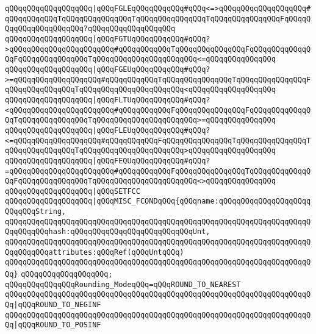 \verb|qQQqqQQqqQQqqQQqqQQq|\verb#|qQQqFGLEqQQqqQQqqQQq#\verb|#qQQq<=>qQQqqQQqqQQqqQQqqQQq#qQQqqQQqqQQqTqQQqqQQqqQQqqQQqTqQQqqQQqqQQqqQQqTqQQqqQQqqQQqqQQqFqQQqqQQqqQQqqQQqqQQqqQQq?qQQqqQQqqQQqqQQqqQQq|\newline
\verb|qQQqqQQqqQQqqQQqqQQq|\verb#|qQQqFGTUqQQqqQQqqQQq#\verb|#qQQq?>qQQqqQQqqQQqqQQqqQQqqQQq#qQQqqQQqqQQqTqQQqqQQqqQQqqQQqFqQQqqQQqqQQqqQQqFqQQqqQQqqQQqqQQqTqQQqqQQqqQQqqQQqqQQqqQQq<=qQQqqQQqqQQqqQQq|\newline
\verb|qQQqqQQqqQQqqQQqqQQq|\verb#|qQQqFGEUqQQqqQQqqQQq#\verb|#qQQq?>=qQQqqQQqqQQqqQQqqQQq#qQQqqQQqqQQqTqQQqqQQqqQQqqQQqTqQQqqQQqqQQqqQQqFqQQqqQQqqQQqqQQqTqQQqqQQqqQQqqQQqqQQqqQQq<qQQqqQQqqQQqqQQqqQQq|\newline
\verb|qQQqqQQqqQQqqQQqqQQq|\verb#|qQQqFLTUqQQqqQQqqQQq#\verb|#qQQq?<qQQqqQQqqQQqqQQqqQQqqQQq#qQQqqQQqqQQqFqQQqqQQqqQQqqQQqFqQQqqQQqqQQqqQQqTqQQqqQQqqQQqqQQqTqQQqqQQqqQQqqQQqqQQqqQQq>=qQQqqQQqqQQqqQQq|\newline
\verb|qQQqqQQqqQQqqQQqqQQq|\verb#|qQQqFLEUqQQqqQQqqQQq#\verb|#qQQq?<=qQQqqQQqqQQqqQQqqQQq#qQQqqQQqqQQqFqQQqqQQqqQQqqQQqTqQQqqQQqqQQqqQQqTqQQqqQQqqQQqqQQqTqQQqqQQqqQQqqQQqqQQqqQQq>qQQqqQQqqQQqqQQqqQQq|\newline
\verb|qQQqqQQqqQQqqQQqqQQq|\verb#|qQQqFEQUqQQqqQQqqQQq#\verb|#qQQq?=qQQqqQQqqQQqqQQqqQQqqQQq#qQQqqQQqqQQqFqQQqqQQqqQQqqQQqTqQQqqQQqqQQqqQQqFqQQqqQQqqQQqqQQqTqQQqqQQqqQQqqQQqqQQqqQQq<>qQQqqQQqqQQqqQQq|\newline
\verb|qQQqqQQqqQQqqQQqqQQq|\verb#|qQQqSETFCC#\newline
\verb|qQQqqQQqqQQqqQQqqQQq|\verb#|qQQqMISC_FCONDqQQq{qQQqname:qQQqqQQqqQQqqQQqqQQqqQQqqQQqString,#\newline
\verb|qQQqqQQqqQQqqQQqqQQqqQQqqQQqqQQqqQQqqQQqqQQqqQQqqQQqqQQqqQQqqQQqqQQqqQQqqQQqqQQqhash:qQQqqQQqqQQqqQQqqQQqqQQqqQQqUnt,|\newline
\verb|qQQqqQQqqQQqqQQqqQQqqQQqqQQqqQQqqQQqqQQqqQQqqQQqqQQqqQQqqQQqqQQqqQQqqQQqqQQqqQQqattributes:qQQqRef(qQQqUntqQQq)|\newline
\verb|qQQqqQQqqQQqqQQqqQQqqQQqqQQqqQQqqQQqqQQqqQQqqQQqqQQqqQQqqQQqqQQqqQQqqQQq}|\newline
\verb|qQQqqQQqqQQqqQQqqQQq;|\newline
\newline
\verb|qQQqqQQqqQQqqQQqRounding_ModeqQQq=qQQqROUND_TO_NEAREST|\newline
\verb|qQQqqQQqqQQqqQQqqQQqqQQqqQQqqQQqqQQqqQQqqQQqqQQqqQQqqQQqqQQqqQQqqQQqqQQq|\verb#|qQQqROUND_TO_NEGINF#\newline
\verb|qQQqqQQqqQQqqQQqqQQqqQQqqQQqqQQqqQQqqQQqqQQqqQQqqQQqqQQqqQQqqQQqqQQqqQQq|\verb#|qQQqROUND_TO_POSINF#\newline
